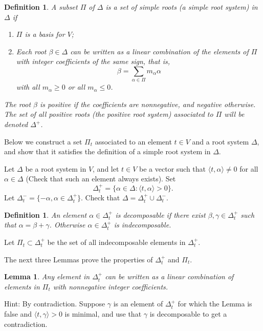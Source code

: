 \documentclass[11pt]{amsart}
\newtheorem{definition}[theorem]{Definition}
\newtheorem{lemma}[theorem]{Lemma}
\begin{document}
\begin{definition} A subset $\Pi$ of $\Delta$ is a \emph{set of simple roots} 
(a \emph{simple root system}) in $\Delta$ if \begin{enumerate}
\item{ $\Pi$ is a basis for $V$;}
\item{Each root $\beta \in \Delta$ can be written as a linear 
combination of the elements of $\Pi$ with integer coefficients of the 
same sign, that is,
$$ \beta = \sum_{\alpha \in \Pi} m_\alpha \alpha $$
with all $m_\alpha \geq 0$ or all $m_\alpha \leq 0$.}
\end{enumerate}
 The root $\beta$ is 
\emph{positive} if the coefficients are nonnegative, 
and \emph{negative} otherwise. 
The set of all positive roots (the \emph{positive root system}) associated to 
$\Pi$ will be denoted $\Delta^+$. 
\end{definition} 

Below we construct a set $\Pi_t$ associated to an element $t \in V$ and 
a root system $\Delta$, and 
show that it satisfies the definition of a simple root system in $\Delta$. 

Let $\Delta $ be a root system in $V$, and 
let $t \in V$ be a vector such that $\langle t, \alpha \rangle \neq 0$ for 
all $\alpha \in \Delta$ (Check that such an element always exists). 
Set 
$$\Delta_t^+ = \{ \alpha \in \Delta : \langle t, \alpha \rangle >0 \}.$$ 
Let $\Delta_t^- = \{ -\alpha, \alpha \in \Delta_t^+ \}$. 
Check that $\Delta = \Delta_t^+ \cup \Delta_t^-$. 

\begin{definition} An element $\alpha \in \Delta_t^+$ is \emph{decomposable} 
if there exist $\beta, \gamma \in \Delta_t^+$ such that 
$\alpha = \beta +\gamma$. Otherwise $\alpha \in \Delta_t^+$ is 
\emph{indecomposable}.
\end{definition} 

Let $\Pi_t \subset \Delta_t^+$ be the set of all indecomposable elements 
in $\Delta_t^+$. 

The next three Lemmas prove the properties of $\Delta_t^+$  and $\Pi_t$.   

\begin{lemma} \label{pos} 
Any element in $\Delta_t^+$ can be written as a linear combination 
of elements in $\Pi_t$ with nonnegative integer coefficients. 
\end{lemma}
Hint: By contradiction. Suppose $\gamma$ is an element of $\Delta_t^+$ 
for which the Lemma is false and $\langle t, \gamma \rangle>0$ is minimal, 
and use that $\gamma$ is decomposable to get a contradiction. 
\end{document}
